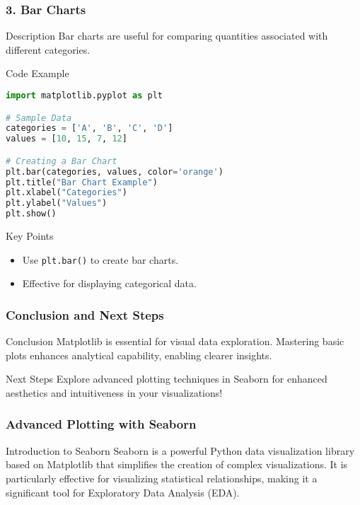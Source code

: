\documentclass{beamer}
\begin{document}
\begin{frame}[fragile]
    \frametitle{3. Bar Charts}
    \begin{block}{Description}
        Bar charts are useful for comparing quantities associated with different categories.
    \end{block}
    
    \begin{block}{Code Example}
    \begin{lstlisting}[language=Python]
import matplotlib.pyplot as plt

# Sample Data
categories = ['A', 'B', 'C', 'D']
values = [10, 15, 7, 12]

# Creating a Bar Chart
plt.bar(categories, values, color='orange')
plt.title("Bar Chart Example")
plt.xlabel("Categories")
plt.ylabel("Values")
plt.show()
    \end{lstlisting}
    \end{block}
    
    \begin{block}{Key Points}
        \begin{itemize}
            \item Use \texttt{plt.bar()} to create bar charts.
            \item Effective for displaying categorical data.
        \end{itemize}
    \end{block}
\end{frame}

\begin{frame}
    \frametitle{Conclusion and Next Steps}
    \begin{block}{Conclusion}
        Matplotlib is essential for visual data exploration. Mastering basic plots enhances analytical capability, enabling clearer insights.
    \end{block}
    
    \begin{block}{Next Steps}
        Explore advanced plotting techniques in Seaborn for enhanced aesthetics and intuitiveness in your visualizations!
    \end{block}
\end{frame}

\begin{frame}[fragile]
    \frametitle{Advanced Plotting with Seaborn}
    \begin{block}{Introduction to Seaborn}
        Seaborn is a powerful Python data visualization library based on Matplotlib that simplifies the creation of complex visualizations. It is particularly effective for visualizing statistical relationships, making it a significant tool for Exploratory Data Analysis (EDA).
    \end{block}
\end{frame}
\end{document}

